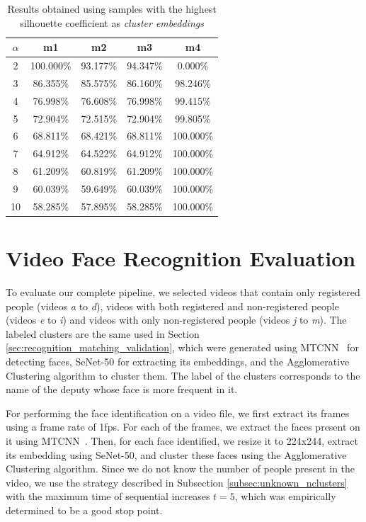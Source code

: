 \begin{table}[!ht]
\centering
\small
\caption{Results obtained using samples with the highest silhouette coefficient as \emph{cluster embeddings}}
\label{tab:results_silhouette}
\begin{tabular}{ccccc}
\hline
\textbf{$\alpha$} & \textbf{m1} & \textbf{m2} & \textbf{m3} & \textbf{m4} \\ \hline
2 & 100.000\% & 93.177\% & 94.347\% & 0.000\% \\
3 & 86.355\% & 85.575\% & 86.160\% & 98.246\% \\
4 & 76.998\% & 76.608\% & 76.998\% & 99.415\% \\
5 & 72.904\% & 72.515\% & 72.904\% & 99.805\% \\
6 & 68.811\% & 68.421\% & 68.811\% & 100.000\% \\
7 & 64.912\% & 64.522\% & 64.912\% & 100.000\% \\
8 & 61.209\% & 60.819\% & 61.209\% & 100.000\% \\
9 & 60.039\% & 59.649\% & 60.039\% & 100.000\% \\
10 & 58.285\% & 57.895\% & 58.285\% & 100.000\%
\end{tabular}
\end{table}

\section{Video Face Recognition Evaluation}
\label{sec:recognition_video_evaluation}

To evaluate our complete pipeline, we selected videos that contain only registered people (videos \emph{a} to \emph{d}), videos with both registered and non-registered people (videos \emph{e} to \emph{i}) and videos with only non-registered people (videos \emph{j} to \emph{m}).
The labeled clusters are the same used in Section \ref{sec:recognition_matching_validation}, which were generated using MTCNN~\cite{mtcnn} for detecting faces, SeNet-50 for extracting its embeddings, and the Agglomerative Clustering algorithm to cluster them. 
The label of the clusters corresponds to the name of the deputy whose face is more frequent in it.

For performing the face identification on a video file, we first extract its frames using a frame rate of 1fps. 
For each of the frames, we extract the faces present on it using MTCNN~\cite{mtcnn}. 
Then, for each face identified, we resize it to 224x244, extract its embedding using SeNet-50, and cluster these faces using the Agglomerative Clustering algorithm.
Since we do not know the number of people present in the video, we use the strategy described in Subsection \ref{subsec:unknown_nclusters} with the maximum time of sequential increases $t=5$, which was empirically determined to be a good stop point.

